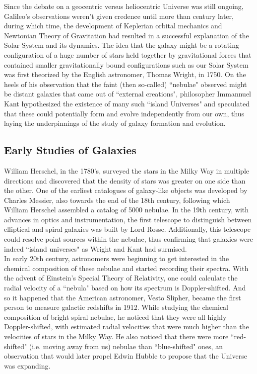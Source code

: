 Since the debate on a geocentric versus heliocentric Universe was still ongoing, Galileo's observations weren't given credence until more than century later, during which time, the development of Keplerian orbital mechanics and Newtonian Theory of Gravitation had resulted in a successful explanation of the Solar System and its dynamics. The idea that the galaxy might be a rotating configuration of a huge number of stars held together by gravitational forces that contained smaller gravitationally bound configurations such as our Solar System was first theorized by the English astronomer, Thomas Wright, in 1750. On the heels of his observation that the faint (then so-called) ``nebulae" observed might be distant galaxies that came out of ``external creations", philosopher Immannuel Kant hypothesized the existence of many such ``island Universes" and speculated that these could potentially form and evolve independently from our own, thus laying the underpinnings of the study of galaxy formation and evolution.\\

\subsection{Early Studies of Galaxies}

William Herschel, in the 1780's, surveyed the stars in the Milky Way in multiple directions and discovered that the density of stars was greater on one side than the other. One of the earliest catalogues of galaxy-like objects was developed by Charles Messier, also towards the end of the 18th century, following which William Herschel assembled a catalog of 5000 nebulae. In the 19th century, with advances in optics and instrumentation, the first telescope to distinguish between elliptical and spiral galaxies was built by Lord Rosse. Additionally, this telescope could resolve point sources within the nebulae, thus confirming that galaxies were indeed ``island universes" as Wright and Kant had surmised.\\

In early 20th century, astronomers were beginning to get interested in the chemical composition of these nebulae and started recording their spectra. With the advent of Einstein's Special Theory of Relativity, one could calculate the radial velocity of a ``nebula" based on how its spectrum is Doppler-shifted. And so it happened that the American astronomer, Vesto Slipher, became the first person to measure galactic redshifts in 1912. While studying the chemical composition of bright spiral nebulae, he noticed that they were all highly Doppler-shifted, with estimated radial velocities that were much higher than the velocities of stars in the Milky Way. He also noticed that there were more ``red-shifted" (i.e. moving away from us) nebulae than ``blue-shifted" ones, an observation that would later propel Edwin Hubble to propose that the Universe was expanding.\\

